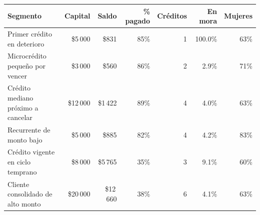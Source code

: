\begin{tabular}{@{}p{4.6cm}rrrrrr@{}}
\toprule
\textbf{Segmento} & \textbf{Capital} & \textbf{Saldo} & \textbf{\% pagado} & \textbf{Créditos} & \textbf{En mora} & \textbf{Mujeres} \\
\midrule
Primer crédito en deterioro & \$5\,000 & \$831 & 85\% & 1 & 100.0\% & 63\% \\
Microcrédito pequeño por vencer & \$3\,000 & \$560 & 86\% & 2 & 2.9\% & 71\% \\
Crédito mediano próximo a cancelar & \$12\,000 & \$1\,422 & 89\% & 4 & 4.0\% & 63\% \\
Recurrente de monto bajo & \$5\,000 & \$885 & 82\% & 4 & 4.2\% & 83\% \\
Crédito vigente en ciclo temprano & \$8\,000 & \$5\,765 & 35\% & 3 & 9.1\% & 60\% \\
Cliente consolidado de alto monto & \$20\,000 & \$12\,660 & 38\% & 6 & 4.1\% & 63\% \\
\bottomrule
\end{tabular}